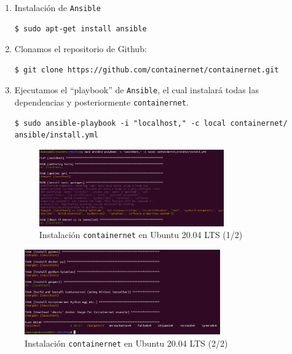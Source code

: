 \documentclass[a4paper, oneside, 12pt]{book}
\begin{document}
	\begin{enumerate}
		\item Instalación de \texttt{Ansible}
		\begin{verbatim}
$ sudo apt-get install ansible
		\end{verbatim}
	
		\item Clonamos el repositorio de Github:
		\begin{verbatim}
$ git clone https://github.com/containernet/containernet.git
		\end{verbatim}
	
		\item Ejecutamos el ``playbook'' de \texttt{Ansible}, el cual instalará todas las dependencias y posteriormente \texttt{containernet}.
		\begin{verbatim}
$ sudo ansible-playbook -i "localhost," -c local containernet/
ansible/install.yml
		\end{verbatim}
	
		\begin{figure}[h!]
			\begin{center}
				\includegraphics[width=0.75\textwidth]{img/cn_install1.png}
				\caption{Instalación \texttt{containernet} en Ubuntu 20.04 LTS (1/2)}	
			\end{center}
		\end{figure}
	\end{enumerate}
	
	\pagebreak
	
	\begin{figure}[h!]
		\begin{center}
			\includegraphics[width=0.75\textwidth]{img/cn_install2.png}
			\caption{Instalación \texttt{containernet} en Ubuntu 20.04 LTS (2/2)}
			\label{img: containernet install}
		\end{center}
	\end{figure}
	
\end{document}
